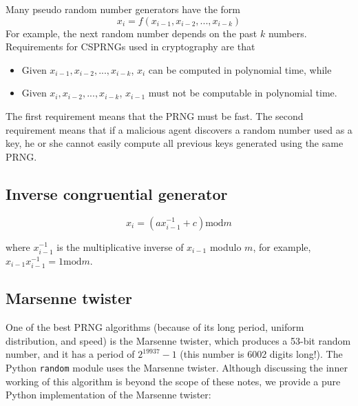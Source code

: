 \documentclass[justified, sixbynine]{tufte-book}
\def\ft{\small\tt}
\theoremstyle{plain}%
\newtheorem * {corollary}{Corollary}
\theoremstyle{definition}
\theoremstyle{remark}
\newtheorem * {remark}{Remark}
\newtheorem * {note}{Note}
\begin{document}
\begin{fullwidth}
Many pseudo random number generators have the form
\begin{equation}
x_i=f(x_{i-1}, x_{i-2}, ..., x_{i-k})
\end{equation}
For example, the next random number depends on the past $k$ numbers. Requirements for CSPRNGs used in cryptography are that

\begin{itemize}
\item  Given $x_{i-1}, x_{i-2}, ..., x_{i-k}$, $x_i$ can be computed in
polynomial time, while

\item  Given $x_i, x_{i-2}, ..., x_{i-k}$, $x_{i-1}$ must not be computable in
polynomial time.
\end{itemize}

The first requirement means that the PRNG must be fast. The second
requirement means that if a malicious agent discovers a random number used
as a key, he or she cannot easily compute all previous keys generated using the
same PRNG.

\goodbreak\subsection{Inverse congruential generator}

\begin{equation}
x_i=(ax_{i-1}^{-1}+c)\textrm{mod}m
\end{equation}

where $x_{i-1}^{-1}$ is the multiplicative inverse of $x_{i-1}$ modulo $m$, 
for example, $x_{i-1}x_{i-1}^{-1}=1\textrm{mod}m$.


\goodbreak\subsection{Marsenne twister}

One of the best PRNG algorithms (because of its long period, uniform distribution, and speed) is the Marsenne twister, which produces a 53-bit random number, 
and it has a period of $2^{19937}-1$ (this number is 6002 digits long!).
The Python {\ft random} module uses the Marsenne twister.
Although discussing the inner working of this algorithm is beyond the scope of these notes, we provide a
pure Python implementation of the Marsenne twister:



\end{fullwidth}
\end{document}
